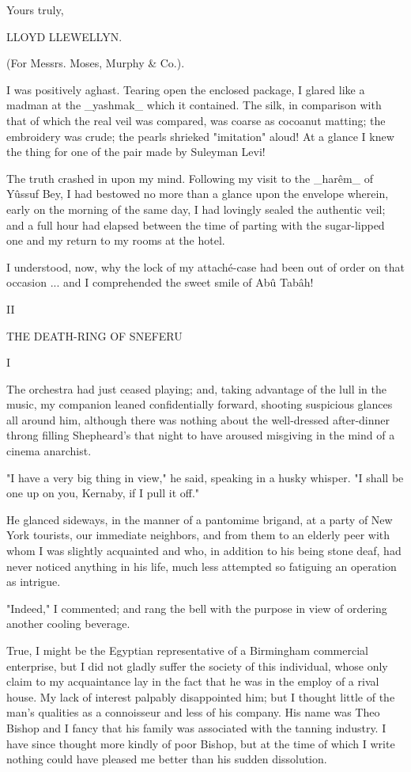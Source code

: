              Yours truly,

                 LLOYD LLEWELLYN.

     (For Messrs. Moses, Murphy & Co.).

I was positively aghast. Tearing open the enclosed package, I glared
like a madman at the _yashmak_ which it contained. The silk, in
comparison with that of which the real veil was compared, was coarse
as cocoanut matting; the embroidery was crude; the pearls shrieked
"imitation" aloud! At a glance I knew the thing for one of the pair
made by Suleyman Levi!

The truth crashed in upon my mind. Following my visit to the _harêm_
of Yûssuf Bey, I had bestowed no more than a glance upon the envelope
wherein, early on the morning of the same day, I had lovingly sealed
the authentic veil; and a full hour had elapsed between the time of
parting with the sugar-lipped one and my return to my rooms at the
hotel.

I understood, now, why the lock of my attaché-case had been out of
order on that occasion ... and I comprehended the sweet smile of Abû
Tabâh!




II

THE DEATH-RING OF SNEFERU


I

The orchestra had just ceased playing; and, taking advantage of the
lull in the music, my companion leaned confidentially forward,
shooting suspicious glances all around him, although there was nothing
about the well-dressed after-dinner throng filling Shepheard's that
night to have aroused misgiving in the mind of a cinema anarchist.

"I have a very big thing in view," he said, speaking in a husky
whisper. "I shall be one up on you, Kernaby, if I pull it off."

He glanced sideways, in the manner of a pantomime brigand, at a party
of New York tourists, our immediate neighbors, and from them to an
elderly peer with whom I was slightly acquainted and who, in addition
to his being stone deaf, had never noticed anything in his life, much
less attempted so fatiguing an operation as intrigue.

"Indeed," I commented; and rang the bell with the purpose in view of
ordering another cooling beverage.

True, I might be the Egyptian representative of a Birmingham
commercial enterprise, but I did not gladly suffer the society of
this individual, whose only claim to my acquaintance lay in the fact
that he was in the employ of a rival house. My lack of interest
palpably disappointed him; but I thought little of the man's qualities
as a connoisseur and less of his company. His name was Theo Bishop and
I fancy that his family was associated with the tanning industry.
I have since thought more kindly of poor Bishop, but at the time of
which I write nothing could have pleased me better than his sudden
dissolution.

